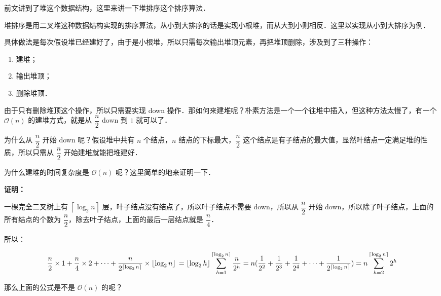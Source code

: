 
前文讲到了堆这个数据结构，这里来讲一下堆排序这个排序算法．

堆排序是用二叉堆这种数据结构实现的排序算法，从小到大排序的话是实现小根堆，而从大到小则相反．这里以实现从小到大排序为例．

具体做法是每次假设堆已经建好了，由于是小根堆，所以只需每次输出堆顶元素，再把堆顶删除，涉及到了三种操作：

\begin{enumerate}
\item 建堆；
\item 输出堆顶；
\item 删除堆顶．
\end{enumerate}

由于只有删除堆顶这个操作，所以只需要实现 down 操作．那如何来建堆呢？朴素方法是一个一个往堆中插入，但这种方法太慢了，有一个 $\mathcal{O}(n)$ 的建堆方式，就是从 $\dfrac{n}{2}$ down 到 $1$ 就可以了． 

为什么从 $\dfrac{n}{2}$ 开始 down 呢？假设堆中共有 $n$ 个结点，$n$ 结点的下标最大，$\dfrac{n}{2}$ 这个结点是有子结点的最大值，显然叶结点一定满足堆的性质，所以只需从 $\dfrac{n}{2}$ 开始建堆就能把堆建好．

为什么建堆的时间复杂度是 $\mathcal{O}(n)$ 呢？这里简单的地来证明一下．

\textbf{证明：}

一棵完全二叉树上有 $\left\lceil{\log_2 n}\right\rceil$ 层，叶子结点没有结点了，所以叶子结点不需要 down，所以从 $\dfrac{n}{2}$ 开始 down，所以除了叶子结点，上面的所有结点的个数为 $\dfrac{n}{2}$，除去叶子结点，上面的最后一层结点就是 $\dfrac{n}{4}$．

所以：

\begin{equation}
\dfrac{n}{2} \times 1 + \dfrac{n}{4} \times 2 + \cdots + \dfrac{n}{2^{\left\lceil{\log_2 n}\right\rceil}} \times \left\lfloor{\log_2 n}\right\rfloor \\
= \left\lfloor{\log_2 h}\right\rfloor \sum ^ {\left\lceil{\log_2 n}\right\rceil} _ {h=1} \dfrac{n}{2^h} \\
= n(\dfrac{1}{2^2} + \dfrac{1}{2^3} + \dfrac{1}{2^4} + \cdots +\dfrac{1}{2^{\left\lceil{\log_2 n}\right\rceil}}) \\
= n \sum^{\left\lceil{\log_2 n}\right\rceil} _ {h = 2} 2^h\\
\end{equation}

那么上面的公式是不是 $\mathcal{O}(n)$ 的呢？

